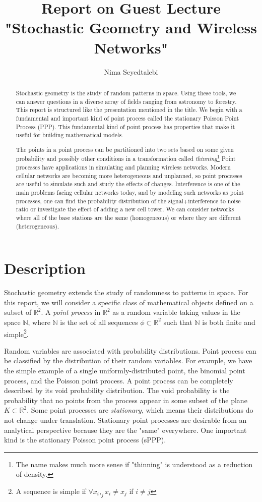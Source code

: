 \documentclass[]{article}
\title{Report on Guest Lecture "Stochastic Geometry and Wireless Networks"}
\author{Nima Seyedtalebi}
\begin{document}
\maketitle

\begin{abstract}
Stochastic geometry is the study of random patterns in space. Using these tools, we can answer questions in a diverse array of fields ranging from astronomy to forestry. This report is structured like the presentation mentioned in the title. We begin with a fundamental and important kind of point process called the stationary Poisson Point Process (PPP). This fundamental kind of point process has properties that make it useful for building mathematical models. 

The points in a point process can be partitioned into two sets based on some given probability and possibly other conditions in a transformation called \textit{thinning}\footnote{The name makes much more sense if "thinning" is understood as a reduction of density.} Point processes have applications in simulating and planning wireless networks. Modern cellular networks are becoming more heterogeneous and unplanned, so point processes are useful to simulate such and study the effects of changes. Interference is one of the main problems facing cellular networks today, and by modeling such networks as point processes, one can find the probability distribution of the signal+interference to noise ratio or investigate the effect of adding a new cell tower. We can consider networks where all of the base stations are the same (homogeneous) or where they are different (heterogeneous).
\end{abstract}

\section{Description}
Stochastic geometry extends the study of randomness to patterns in space. For this report, we will consider a specific class of mathematical objects defined on a subset of $\mathbb{R}^2$. A \textit{point process} in $\mathbb{R}^2$ as a random variable taking values in the space $\mathbb{N}$, where $\mathbb{N}$ is the set of all sequences $\phi \subset \mathbb{R}^2$ such that $\mathbb{N}$ is both finite and simple\cite{kham}\footnote{A sequence is simple if $\forall x_i,_j x_i \neq x_j$ if $i \neq j$}.

Random variables are associated with probability distributions. Point process can be classified by the distribution of their random variables. For example, we have the simple example of a single uniformly-distributed point, the binomial point process, and the Poisson point process. A point process can be completely described by its void probability distribution. The void probability is the probability that no points from the process appear in some subset of the plane $K \subset \mathbb{R}^2$\cite{ppp}.
Some point processes are \textit{stationary}, which means their distributions do not change under translation.
Stationary point processes are desirable from an analytical perspective because they are the "same" everywhere. One important kind is the stationary Poisson point process (sPPP).
\end{document}
